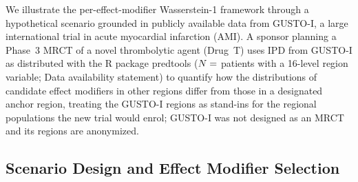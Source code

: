 \documentclass[AMA,Times1COL]{WileyNJDv5}
\begin{document}
We illustrate the per-effect-modifier Wasserstein-1 framework through a hypothetical scenario grounded in publicly available data from GUSTO-I, a large international trial in acute myocardial infarction (AMI). A sponsor planning a Phase~3 MRCT of a novel thrombolytic agent (Drug~T) uses IPD from GUSTO-I\cite{gusto1993} as distributed with the R package predtools ($N = \numval{gustoN}$ patients with a 16-level region variable; Data availability statement) to quantify how the distributions of candidate effect modifiers in other regions differ from those in a designated anchor region, treating the GUSTO-I regions as stand-ins for the regional populations the new trial would enrol; GUSTO-I was not designed as an MRCT and its regions are anonymized.

\subsection{Scenario Design and Effect Modifier Selection}\label{sec:app_scenario}
\end{document}
